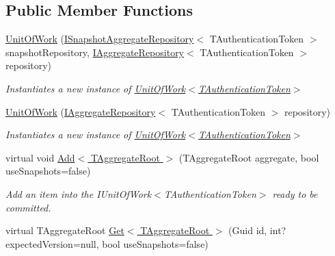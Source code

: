 \subsection*{Public Member Functions}
\begin{DoxyCompactItemize}
\item 
\hyperlink{classCqrs_1_1Domain_1_1UnitOfWork_a9ec92dbd580f3885f7cf5a9ad360e1ac_a9ec92dbd580f3885f7cf5a9ad360e1ac}{Unit\+Of\+Work} (\hyperlink{interfaceCqrs_1_1Domain_1_1ISnapshotAggregateRepository}{I\+Snapshot\+Aggregate\+Repository}$<$ T\+Authentication\+Token $>$ snapshot\+Repository, \hyperlink{interfaceCqrs_1_1Domain_1_1IAggregateRepository}{I\+Aggregate\+Repository}$<$ T\+Authentication\+Token $>$ repository)
\begin{DoxyCompactList}\small\item\em Instantiates a new instance of \hyperlink{classCqrs_1_1Domain_1_1UnitOfWork_a9ec92dbd580f3885f7cf5a9ad360e1ac_a9ec92dbd580f3885f7cf5a9ad360e1ac}{Unit\+Of\+Work$<$\+T\+Authentication\+Token$>$} \end{DoxyCompactList}\item 
\hyperlink{classCqrs_1_1Domain_1_1UnitOfWork_a717facda044d5025e9d7abdec4f54acd_a717facda044d5025e9d7abdec4f54acd}{Unit\+Of\+Work} (\hyperlink{interfaceCqrs_1_1Domain_1_1IAggregateRepository}{I\+Aggregate\+Repository}$<$ T\+Authentication\+Token $>$ repository)
\begin{DoxyCompactList}\small\item\em Instantiates a new instance of \hyperlink{classCqrs_1_1Domain_1_1UnitOfWork_a9ec92dbd580f3885f7cf5a9ad360e1ac_a9ec92dbd580f3885f7cf5a9ad360e1ac}{Unit\+Of\+Work$<$\+T\+Authentication\+Token$>$} \end{DoxyCompactList}\item 
virtual void \hyperlink{classCqrs_1_1Domain_1_1UnitOfWork_a91bd702e09fb175e7b6bb4ee2a66bb61_a91bd702e09fb175e7b6bb4ee2a66bb61}{Add$<$ T\+Aggregate\+Root $>$} (T\+Aggregate\+Root aggregate, bool use\+Snapshots=false)
\begin{DoxyCompactList}\small\item\em Add an item into the I\+Unit\+Of\+Work$<$\+T\+Authentication\+Token$>$ ready to be committed. \end{DoxyCompactList}\item 
virtual T\+Aggregate\+Root \hyperlink{classCqrs_1_1Domain_1_1UnitOfWork_a72f0ec98b1ea4b74af7d0daa5cb73c03_a72f0ec98b1ea4b74af7d0daa5cb73c03}{Get$<$ T\+Aggregate\+Root $>$} (Guid id, int? expected\+Version=null, bool use\+Snapshots=false)

\end{DoxyCompactItemize}
